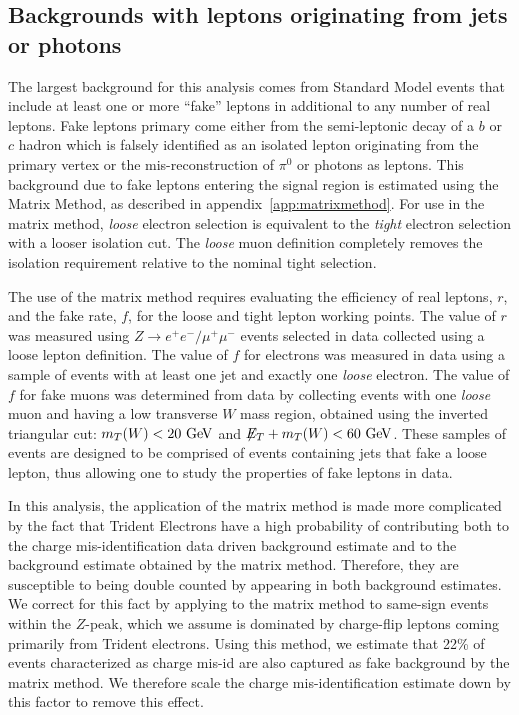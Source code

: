 \subsection{Backgrounds with leptons originating from jets or photons}\label{sect:fakes}

The largest background for this analysis comes from Standard Model events that include at least one or more ``fake'' leptons in additional to any number of real leptons.
Fake leptons primary come either from the semi-leptonic decay of a $b$ or $c$ hadron which is falsely identified as an isolated lepton originating from the primary vertex or the mis-reconstruction of  $\pi^0$ or photons as leptons.
This background due to fake leptons entering the signal region is estimated using the Matrix Method, as described in appendix~\ref{app:matrixmethod}.
For use in the matrix method,  {\it loose} electron selection is equivalent to the {\it tight} 
electron selection with a looser isolation cut.
The {\it loose} muon definition completely removes the isolation requirement relative to the nominal tight selection.

The use of the matrix method requires evaluating the efficiency of real leptons, $r$, and the fake rate, $f$,
for the loose and tight lepton working points.
The value of $r$ was measured using $Z \rightarrow e^+e^-/\mu^+\mu^-$ events selected in data
collected using a loose lepton definition.
The value of $f$ for electrons was measured in data using a sample of events
with at least one jet and exactly one {\it loose} electron.
The value of $f$ for fake muons was determined from data
by collecting events with one {\it loose} muon and having a low transverse $W$ mass region,
obtained using the inverted triangular cut: $m_T(W)<20 \GeV$ and $\met{}+m_T(W)<60 \GeV$.
These samples of events are designed to be comprised of events containing jets that fake
a loose lepton, thus allowing one to study the properties of fake leptons in data.

In this analysis, the application of the matrix method is made more complicated by the fact that
Trident Electrons have a high probability of contributing both to the charge mis-identification data driven background estimate
and to the background estimate obtained by the matrix method.
Therefore, they are susceptible to being double counted by appearing in both background estimates.
We correct for this fact by applying to the matrix method to same-sign events within the $Z$-peak,
which we assume is dominated by charge-flip leptons coming primarily from Trident electrons.
Using this method, we estimate that 22\% of events characterized as charge mis-id are also
captured as fake background by the matrix method.
We therefore scale the charge mis-identification estimate down by this factor to remove this effect.

